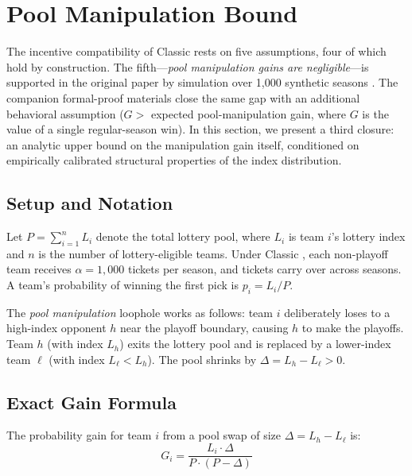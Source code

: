 \section{Pool Manipulation Bound}
\label{sec:bound}


The incentive compatibility of Classic \cola{} rests on five assumptions, four of which hold by construction. The fifth---\emph{pool manipulation gains are negligible}---is supported in the original paper by simulation over 1{,}000 synthetic seasons \citep{highley2026cola}. The companion formal-proof materials close the same gap with an additional behavioral assumption ($G > $ expected pool-manipulation gain, where $G$ is the value of a single regular-season win). In this section, we present a third closure: an analytic upper bound on the manipulation gain itself, conditioned on empirically calibrated structural properties of the index distribution.

\subsection{Setup and Notation}

Let $P = \sum_{i=1}^{n} L_i$ denote the total lottery pool, where $L_i$ is team $i$'s lottery index and $n$ is the number of lottery-eligible teams. Under Classic \cola{}, each non-playoff team receives $\alpha = 1{,}000$ tickets per season, and tickets carry over across seasons. A team's probability of winning the first pick is $p_i = L_i / P$.

The \emph{pool manipulation} loophole works as follows: team $i$ deliberately loses to a high-index opponent $h$ near the playoff boundary, causing $h$ to make the playoffs. Team $h$ (with index $L_h$) exits the lottery pool and is replaced by a lower-index team $\ell$ (with index $L_\ell < L_h$). The pool shrinks by $\Delta = L_h - L_\ell > 0$.

\subsection{Exact Gain Formula}

\begin{proposition}
\label{prop:gain}
The probability gain for team $i$ from a pool swap of size $\Delta = L_h - L_\ell$ is:
\begin{equation}
\label{eq:gain}
G_i = \frac{L_i \cdot \Delta}{P \cdot (P - \Delta)}
\end{equation}
\end{proposition}

